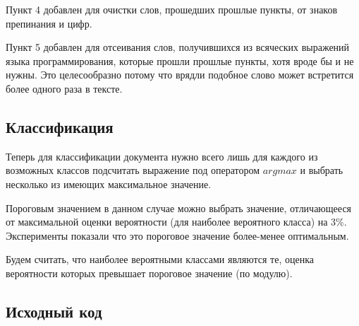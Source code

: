 \documentclass[12pt,a4paper]{scrartcl}
\begin{document}
Пункт 4 добавлен для очистки слов, прошедших прошлые пункты, от знаков препинания и цифр.

Пункт 5 добавлен для отсеивания слов, получившихся из всяческих выражений языка программирования, которые прошли прошлые пункты, хотя вроде бы и не нужны. Это целесообразно потому что врядли подобное слово может встретится более одного раза в тексте.

\subsection*{Классификация}

Теперь для классификации документа нужно всего лишь для каждого из возможных классов подсчитать выражение под оператором $argmax$ и выбрать несколько из имеющих максимальное значение.

Пороговым значением в данном случае можно выбрать значение, отличающееся от максимальной оценки вероятности (для наиболее вероятного класса) на 3\%. Эксперименты показали что это пороговое значение более-менее оптимальным.

Будем считать, что наиболее вероятными классами являются те, оценка вероятности которых превышает пороговое значение (по модулю).

\subsection*{Исходный код}
\end{document}
